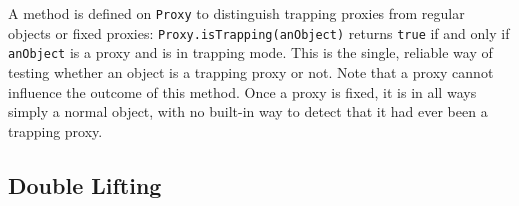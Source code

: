 \documentclass{acm_proc_article-sp}
\begin{document}


A method is defined on \texttt{Proxy} to distinguish trapping proxies from regular objects or fixed proxies:
\texttt{Proxy.isTrapping(anObject)} returns \texttt{true} if and only if \texttt{anObject} is a proxy and is in trapping mode. This is the single, reliable way of testing whether an object is a trapping proxy or not. Note that a proxy cannot influence the outcome of this method. Once a proxy is fixed, it is in all ways simply a normal object, with no built-in way to detect that it had ever been a trapping proxy.

%
%
%
%

\subsection{Double Lifting}
\end{document}
